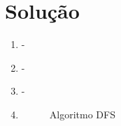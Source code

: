 \documentclass{article}
\begin{document}
\section{Solução}

\begin{enumerate}
    \item -
    \item -
    \item -
    \item 
    \begin{figure}[!ht]
        
        \caption{Algoritmo DFS}
    \end{figure}
\end{enumerate}


%
%
\end{document}
